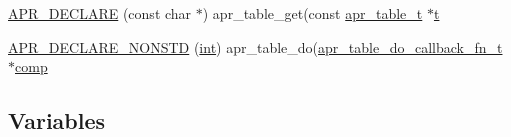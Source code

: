 \begin{DoxyCompactItemize}
\item 
\hyperlink{group__apr__tables_gae5df6767d4348ac55d933a7b29333239}{A\+P\+R\+\_\+\+D\+E\+C\+L\+A\+RE} (const char $\ast$) apr\+\_\+table\+\_\+get(const \hyperlink{structapr__table__t}{apr\+\_\+table\+\_\+t} $\ast$\hyperlink{pcretest_8txt_a9ffb27fb8e1f90c17b13303fee2fb883}{t}
\item 
\hyperlink{group__apr__tables_gab02b0393c878208ff6cb55c701ff536a}{A\+P\+R\+\_\+\+D\+E\+C\+L\+A\+R\+E\+\_\+\+N\+O\+N\+S\+TD} (\hyperlink{pcre_8txt_a42dfa4ff673c82d8efe7144098fbc198}{int}) apr\+\_\+table\+\_\+do(\hyperlink{group__apr__tables_gabac50c7b2bae5f8cef6245d1959f8b06}{apr\+\_\+table\+\_\+do\+\_\+callback\+\_\+fn\+\_\+t} $\ast$\hyperlink{group__apr__skiplist_ga4c81b1eebdb8efeefcadd27cb3fe1c31}{comp}
\end{DoxyCompactItemize}
\subsection*{Variables}
